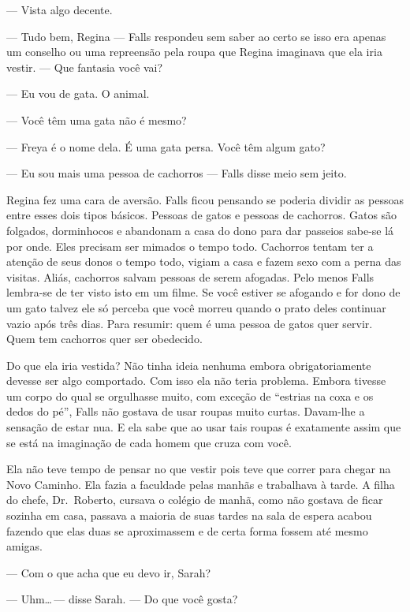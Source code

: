 --- Vista algo decente.

--- Tudo bem, Regina --- Falls respondeu\mudanca{,} sem saber ao certo se isso era apenas um conselho ou uma repreensão pela roupa que Regina imaginava que ela iria vestir. --- Que fantasia você vai?

--- Eu vou de gata. O animal.

--- Você têm uma gata\mudanca{,} não é mesmo?

--- Freya é o nome dela. É uma gata persa. Você têm algum gato?

--- Eu sou mais uma pessoa de cachorros --- Falls disse\mudanca{,} meio sem jeito.

Regina fez uma cara de aversão. Falls ficou pensando se poderia dividir as pessoas entre esses dois tipos básicos. Pessoas de gatos e pessoas de cachorros. Gatos são folgados, dorminhocos e abandonam a casa do dono para dar passeios sabe-se lá por onde. Eles precisam ser mimados o tempo todo. Cachorros tentam ter a atenção de seus donos o tempo todo, vigiam a casa e fazem sexo com a perna das visitas. Aliás, cachorros salvam pessoas de serem afogadas. Pelo menos Falls lembra-se de ter visto isto em um filme. Se você estiver se afogando e for dono de um gato\mudanca{,} talvez ele só perceba que você morreu quando o prato deles continuar vazio após três dias. Para resumir: quem é uma pessoa de gatos quer servir. Quem tem cachorros quer ser obedecido.

Do que ela iria vestida? Não tinha ideia nenhuma\mudanca{,} embora obrigatoriamente devesse ser algo comportado. Com isso\mudanca{,} ela não teria problema. Embora tivesse um corpo do qual se orgulhasse muito, com exceção de ``estrias na coxa e os dedos do pé'', Falls não gostava de usar roupas muito curtas. Davam-lhe a sensação de estar nua. E ela sabe que ao usar tais roupas é exatamente assim que se está na imaginação de cada homem que cruza com você.

Ela não teve tempo de pensar no que vestir pois teve que correr para chegar na Novo Caminho. Ela fazia a faculdade pelas manhãs e trabalhava à tarde. A filha do chefe, Dr.~Roberto, cursava o colégio de manhã, como não gostava de ficar sozinha em casa, passava a maioria de suas tardes na sala de espera acabou fazendo que elas duas se aproximassem e de certa forma fossem até mesmo amigas.

--- Com o que acha que eu devo ir, Sarah?

--- Uhm\ldots\,--- disse Sarah. --- Do que você gosta?

